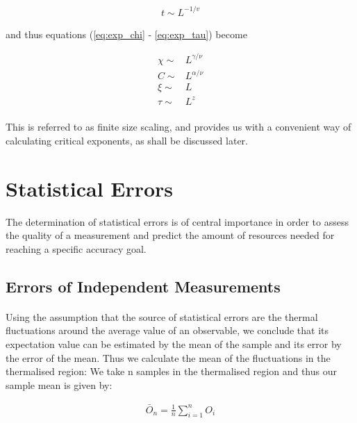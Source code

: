 \documentclass[12pt] {report} %
\begin{document}
				\begin{align}
					t \sim L^{-1/v}	\label{eq:finite_size_scaling}
				\end{align}	
				
				and thus equations (\ref{eq:exp_chi} - \ref{eq:exp_tau}) become
				
				\begin{align}
					\chi \sim& L^{\gamma/\nu} \label{eq:exp_chi_L} \\	
					C \sim& L^{\alpha/\nu}	\label{eq:exp_c_L}	\\
					\xi \sim& L	\label{eq:exp_xi_L} \\
					\tau \sim& L^{z}	\label{eq:exp_tau_L}
				\end{align}
				
				\paragraph{}
					This is referred to as finite size scaling, and provides us with a convenient way of calculating critical exponents, as shall be discussed later.
					
			
		\section{Statistical Errors} \label{sec:errors_section}
			The determination of statistical errors is of central importance in order to assess the quality of a measurement
			and predict the amount of resources needed for reaching a specific accuracy goal.		
			
			\subsection{Errors of Independent Measurements}
				\paragraph{}
					Using the assumption that the source of statistical errors are the thermal fluctuations around the average value of an observable, we conclude that its expectation value can be estimated by the mean of the sample and its error by the error of the mean. Thus we calculate the mean of the fluctuations in the thermalised region: We take n samples in the thermalised region and thus our sample mean is given by:
					
				\begin{align}
					\bar{O}_n = \frac{1}{n} \sum_{i=1}^{n} O_i      \label{eq:average_observable}
				\end{align}
\end{document}
